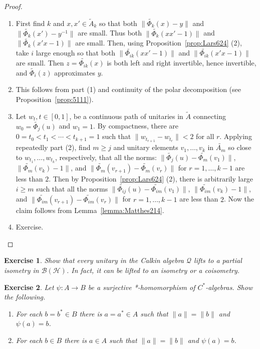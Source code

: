 \documentclass{book}
\newtheorem{exercise}{Exercise}[section]
\def\cstars{\(C^*\)-algebras}
\begin{document}
\begin{proof}
  \begin{enumerate}
    \item First find \(k\) and \(x,x'\in \tilde{A}_k\) so that both \(\|\widetilde{\Phi_k}(x) - y\|\) and 
    \(\|\tilde{\Phi_k}(x') - y^{-1}\|\) are small.
    Thus both \(\|\tilde{\Phi_k}(xx'-1)\|\) and \(\|\tilde{\Phi_k}(x'x-1)\|\) are small. Then, 
    using Proposition~\ref{prop:Lars624} (2), take \(i\)
    large enough so that both \(\|\tilde{\Phi_{ik}}(xx'-1)\|\) and \(\|\tilde{\Phi_{ik}}(x'x -1)\|\) are small. 
    Then \(z = \tilde{\Phi_{ik}}(x)\)
    is both left and right invertible, hence invertible, and \(\tilde{\Phi_i}(z)\) approximates \(y\).
    \item This follows from part (1) and continuity of the polar decomposition (see Proposition~\ref{prop:5111}).
    \item Let \(w_t, t \in [0,1]\), be a continuous path of unitaries in \(\tilde{A}\) connecting \(w_0 = \tilde{\Phi_j}(u)\)
    and \(w_1 = 1\). By compactness, there are \(0 = t_0 < t_1 < \cdots < t_{k+1} = 1\) such that
    \(\|w_{t_{r+1}}-w_{t_r}\| < 2\) for all \(r\). Applying repeatedly part (2), find \(m \geq j\) and unitary elements
    \(v_1, \ldots, v_k\) in \(\tilde{A_m}\) so close to \(w_{t_1},\ldots,w_{t_k}\), respectively, 
    that all the norms: \(\|\tilde{\Phi_j}(u)-\tilde{\Phi_m}(v_1)\|\),
    \(\|\tilde{\Phi_m}(v_k) - 1\|\), and \(\|\tilde{\Phi_m}(v_{r+1}) - \tilde{\Phi_m}(v_r)\|\) for \(r = 1,\ldots,k - 1\) 
    are less than \(2\). Then by
    Proposition~\ref{prop:Lars624} (2), there is arbitrarily large \(i \geq m\) such that all the norms \(\|\tilde{\Phi_{ij}}(u)- \tilde{\Phi_{im}}(v_1)\|\),
    \(\|\tilde{\Phi_{im}}(v_k) - 1\|\), and \(\|\tilde{\Phi_{im}}(v_{r+1}) - \tilde{\Phi_{im}}(v_r)\|\) for \(r = 1,\ldots,k - 1\) are less than \(2\). 
    Now the claim follows from Lemma~\ref{lemma:Matthes214}.
    \item Exercise.
  \end{enumerate}
\end{proof}
\begin{exercise}\label{ex:7311}
  Show that every unitary in the Calkin algebra \(\mathcal{Q}\) lifts to a partial
  isometry in \(\mathcal{B}(\mathcal{H})\). In fact, it can be lifted to an isometry or a coisometry.
\end{exercise}
\begin{exercise}\label{ex:7312}
  Let \(\psi : A \rightarrow B\) be a surjective *-homomorphism of \cstars. Show
  the following.
  \begin{enumerate}
    \item For each \(b = b^* \in B\) there is \(a = a^* \in A\) such that \(\|a\| = \|b\|\) and \(\psi(a) = b\).
    \item For each \(b \in B\) there is \(a \in A\) such that \(\|a\| = \|b\|\) and \(\psi(a) = b\).    
  \end{enumerate}
\end{exercise}
\end{document}
